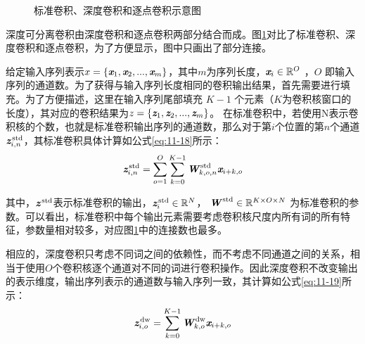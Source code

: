 \begin{figure}[htp]
\centering

\caption{标准卷积、深度卷积和逐点卷积示意图}
\label{fig:11-17}
\end{figure}

\parinterval 深度可分离卷积由深度卷积和逐点卷积两部分结合而成。图\ref{fig:11-17}对比了标准卷积、深度卷积和逐点卷积，为了方便显示，图中只画出了部分连接。

\parinterval 给定输入序列表示${x} = \{ \textbf{\em x}_1,\textbf{\em x}_2,...,\textbf{\em x}_m \}$，其中$m$为序列长度，$\textbf{\em x}_i \in \mathbb{R}^{O} $ ，$O$ 即输入序列的通道数。为了获得与输入序列长度相同的卷积输出结果，首先需要进行填充。为了方便描述，这里在输入序列尾部填充 $K-1$ 个元素（$K$为卷积核窗口的长度），其对应的卷积结果为${z} = \{ \textbf{\em z}_1,\textbf{\em z}_2,...,\textbf{\em z}_m \}$。
在标准卷积中，若使用N表示卷积核的个数，也就是标准卷积输出序列的通道数，那么对于第$i$个位置的第$n$个通道$ \textbf{\em z}_{i,n}^\textrm{\,std}$，其标准卷积具体计算如公式\eqref{eq:11-18}所示：
\begin{eqnarray}
\textbf{\em z}_{i,n}^\textrm{\,std} = \sum_{o=1}^{O} \sum_{k=0}^{K-1} \textbf{\em W}_{k,o,n}^\textrm{\,std} \textbf{\em x}_{i+k,o}
\label{eq:11-18}
\end{eqnarray}


\noindent 其中，$ \textbf{\em z}^\textrm{\,std}$表示标准卷积的输出，$ \textbf{\em z}_i^\textrm{\,std} \in \mathbb{R}^N$， $\textbf{\em W}^\textrm{\,std} \in \mathbb{R}^{K \times O \times N} $ 为标准卷积的参数。可以看出，标准卷积中每个输出元素需要考虑卷积核尺度内所有词的所有特征，参数量相对较多，对应图\ref{fig:11-17}中的连接数也最多。

\parinterval 相应的，深度卷积只考虑不同词之间的依赖性，而不考虑不同通道之间的关系，相当于使用$O$个卷积核逐个通道对不同的词进行卷积操作。因此深度卷积不改变输出的表示维度，输出序列表示的通道数与输入序列一致，其计算如公式\eqref{eq:11-19}所示：
\begin{eqnarray}
\textbf{\em z}_{i,o}^\textrm{\,dw} = \sum_{k=0}^{K-1} \textbf{\em W}_{k,o}^\textrm{\,dw} \textbf{\em x}_{i+k,o}
\label{eq:11-19}
\end{eqnarray}

